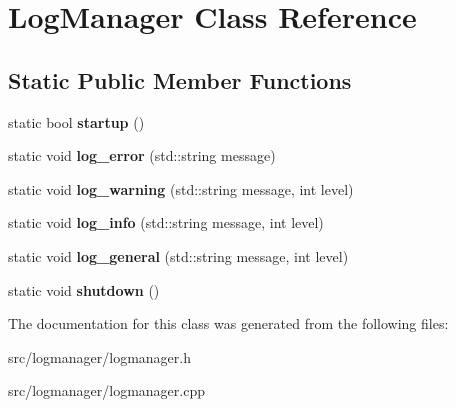 \hypertarget{class_log_manager}{}\section{Log\+Manager Class Reference}
\label{class_log_manager}
\subsection*{Static Public Member Functions}
\begin{DoxyCompactItemize}
\item 
\hypertarget{class_log_manager_a17ab6cc9a74c7776fbe9780787c85703}{}static bool {\bfseries startup} ()\label{class_log_manager_a17ab6cc9a74c7776fbe9780787c85703}

\item 
\hypertarget{class_log_manager_a5c0580b9e7a0a8829ffc5bc62e33e6d6}{}static void {\bfseries log\+\_\+error} (std\+::string message)\label{class_log_manager_a5c0580b9e7a0a8829ffc5bc62e33e6d6}

\item 
\hypertarget{class_log_manager_ab22a4ff9b8c1dfc46beea5cf34c972a8}{}static void {\bfseries log\+\_\+warning} (std\+::string message, int level)\label{class_log_manager_ab22a4ff9b8c1dfc46beea5cf34c972a8}

\item 
\hypertarget{class_log_manager_a0597ea98a6498618520bc5377984e3d0}{}static void {\bfseries log\+\_\+info} (std\+::string message, int level)\label{class_log_manager_a0597ea98a6498618520bc5377984e3d0}

\item 
\hypertarget{class_log_manager_af020eebde8f2fb32b5176c7c28aa4f27}{}static void {\bfseries log\+\_\+general} (std\+::string message, int level)\label{class_log_manager_af020eebde8f2fb32b5176c7c28aa4f27}

\item 
\hypertarget{class_log_manager_a8b7ac63b0398d3009a54dd407e705062}{}static void {\bfseries shutdown} ()\label{class_log_manager_a8b7ac63b0398d3009a54dd407e705062}

\end{DoxyCompactItemize}


The documentation for this class was generated from the following files\+:\begin{DoxyCompactItemize}
\item 
src/logmanager/logmanager.\+h\item 
src/logmanager/logmanager.\+cpp\end{DoxyCompactItemize}
